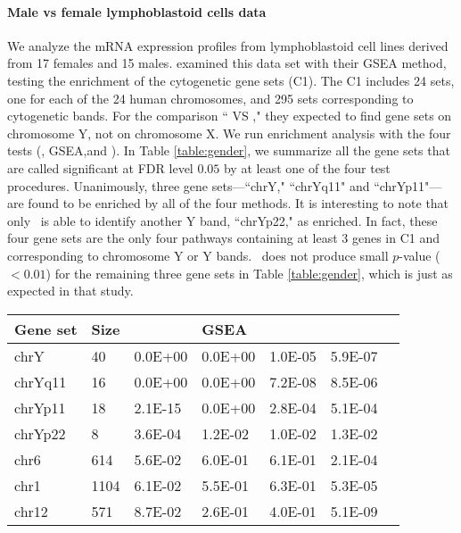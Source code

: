	\paragraph{Male vs female lymphoblastoid cells data}
	We analyze the mRNA expression profiles from lymphoblastoid cell lines derived from 17 females 
	and	15 males. \citet{subramanian2005gene} examined this data set with their GSEA method, 
	testing the enrichment of the  cytogenetic gene sets (C1). The C1 includes 24 sets, one for 
	each of the 24 human chromosomes, and 295 sets corresponding to cytogenetic bands. For the 
	comparison `` VS ," they expected to find gene sets on chromosome Y, 
	not on chromosome X. We run enrichment analysis with the four tests (\OurMethod, GSEA,\CMT and 
	\genr). In Table \ref{table:gender}, we summarize all the gene sets that are called significant 
	at FDR level $0.05$ by at least one of the four test procedures. Unanimously, three gene 
	sets---``chrY," ``chrYq11" and ``chrYp11"---are 
	found to be enriched by all of the four methods. It is interesting to note that only 
	\OurMethod~is able to identify another Y band, ``chrYp22," as enriched. In fact, these four 
	gene sets are the only four pathways containing at least 3 genes in  C1 and corresponding to 
	chromosome Y or Y bands. \OurMethod~does not produce small $p$-value ($<0.01$) for the 
	remaining three gene sets in Table \ref{table:gender}, which is just as expected in that study.
		
	\begin{table*}[!ht]
		\centering
		\caption[Enriched gene sets and their nominal $p$ values for lymphoblastoid cells 
		data]{Enriched gene sets and their nominal $p$ values for lymphoblastoid cells data. 
		Reported are gene sets with $\text{FDR}<0.05$ for at least one of the \OurMethod, GSEA, 
		\CMT~and \genr~methods using \FDR~(\FDRabb) procedure.}
		\begin{tabular}{p{2cm}p{1cm}p{2cm}p{2cm}p{3cm}p{2cm}p{0.5cm}} \hline
			Gene set & Size & \OurMethod & GSEA & \CMT & \genr \\ 		\hline
			chrY & 40 & 0.0E+00 & 0.0E+00 & 1.0E-05 & 5.9E-07 \\ 
			chrYq11 & 16 & 0.0E+00 & 0.0E+00 & 7.2E-08 & 8.5E-06 \\ 
			chrYp11 & 18 & 2.1E-15 & 0.0E+00 & 2.8E-04 & 5.1E-04 \\ 
			chrYp22 & 8 & 3.6E-04 & 1.2E-02 & 1.0E-02 & 1.3E-02 \\ 
			chr6 & 614 & 5.6E-02 & 6.0E-01 & 6.1E-01 & 2.1E-04 \\ 
			chr1 & 1104 & 6.1E-02 & 5.5E-01 & 6.3E-01 & 5.3E-05 \\ 
			chr12 & 571 & 8.7E-02 & 2.6E-01 & 4.0E-01 & 5.1E-09 \\ 
			\hline
		\end{tabular}
		\label{table:gender}
	\end{table*}
	
